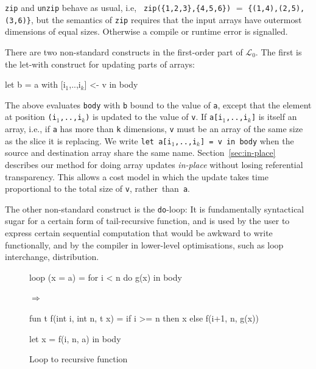 \documentclass{sigplanconf}  %
\newcommand{\mymath}[1]{$ #1 $}
\newcommand{\myindx}[1]{_{#1}}
\newcommand{\LO}{$\mathcal{L}_0$}
\begin{document}
{\tt zip} and {\tt unzip} behave as usual, i.e, {\tt
  zip(\{1,2,3\},\{4,5,6\})} $=$ {\tt \{{(1,4),(2,5),(3,6)}\}}, but the
semantics of {\tt zip} requires that the input arrays have outermost
dimensions of equal sizes. Otherwise a compile or runtime error is signalled.

There are two non-standard constructs in the first-order part  %
of \LO{}.  The first is the let-with construct for updating parts of
arrays:

\begin{colorcode}
let b = a with [i\mymath{\myindx{1}},..,i\mymath{\myindx{k}}] <- v in body
\end{colorcode}

The above evaluates {\tt body} with {\tt b} bound to the value of {\tt a}, 
except that the element at position {\tt (i$_1$,..,i$_k$)} is updated to
the value of {\tt v}.  If {\tt a[i$_1$,..,i$_k$]} is itself an array,
i.e., if {\tt a} has more than {\tt k} dimensions, {\tt v} must be 
an array of the same size as the slice it is replacing.  We write 
{\tt let~a[i$_1$,..,i$_k$]~=~v~in~body} when the 
source and destination array share the same name.
%
Section~\ref{sec:in-place} describes our method for doing array updates 
{\em in-place} without losing referential transparency. This allows a 
cost model in which the update takes time proportional to the total 
size of {\tt v}, rather~than~{\tt a}.

The other non-standard construct is the {\tt do}-loop:  
It is fundamentally syntactical sugar for a certain form of 
tail-recursive function, and is used by the user to express
certain sequential computation that would be awkward to write
functionally, and by the compiler in lower-level optimisations,
such as loop interchange, distribution.  

\begin{figure}
\begin{minipage}{0.35\columnwidth}
\begin{colorcode}
loop (x = a) =
  for i < n do
    g(x)
in body
\end{colorcode}
\end{minipage}
\begin{minipage}{0.05\columnwidth}
$\Rightarrow$
\end{minipage}
\begin{minipage}{0.6\columnwidth}
\begin{colorcode}
fun t f(int i, int n, t x) =
  if i >= n then x
     else f(i+1, n, g(x))

let x = f(i, n, a)
in body
\end{colorcode}
\end{minipage}
\caption{Loop to recursive function}
\label{fig:loop-recursion}
\end{figure}
\end{document}
